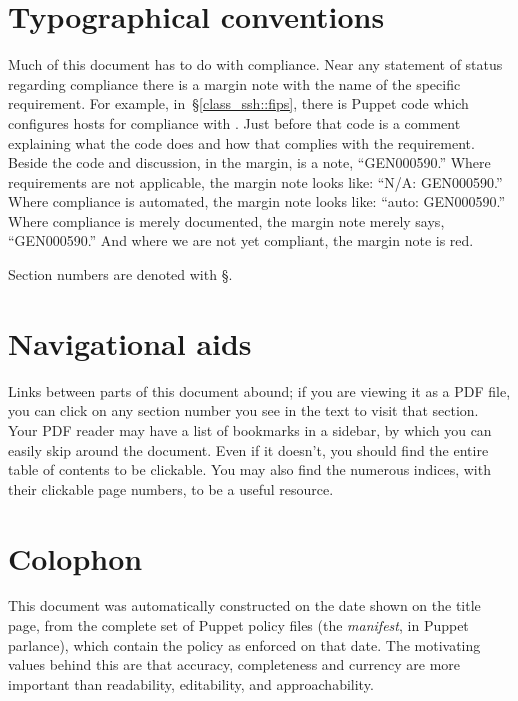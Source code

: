 \section{Typographical conventions}

Much of this document has to do with compliance. Near any statement of
status regarding compliance there is a margin note with the name of the
specific requirement. For example, in~\S\ref{class_ssh::fips}, there is
Puppet code which configures hosts for compliance with
. Just before that code is a comment explaining what
the code does and how that complies with the requirement. Beside the code
and discussion, in the margin, is a note, ``GEN000590.'' Where
requirements are not applicable, the margin note looks like: ``N/A:
GEN000590.'' Where compliance is automated, the margin note looks like:
``auto: GEN000590.'' Where compliance is merely documented, the margin
note merely says, ``GEN000590.'' And where we are not yet compliant, the
margin note is red.

Section numbers are denoted with \S.


\section{Navigational aids}

Links between parts of this document abound; if you are viewing it as a
PDF file, you can click on any section number you see in the text to visit
that section. Your PDF reader may have a list of bookmarks in a sidebar,
by which you can easily skip around the document.  Even if it doesn't, you
should find the entire table of contents to be clickable. You may also
find the numerous indices, with their clickable page numbers, to be a
useful resource.


\section{Colophon}
\label{Colophon}

This document was automatically constructed on the date shown on the title
page, from the complete set of Puppet policy files (the \emph{manifest},
in Puppet parlance), which contain the policy as enforced on that date.
The motivating values behind this are that accuracy, completeness and
currency are more important than readability, editability, and
approachability.

